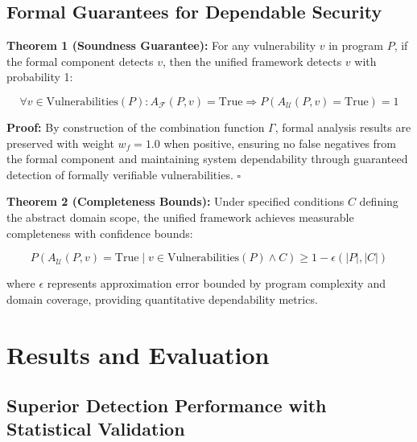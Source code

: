 \documentclass[10pt,journal,compsoc]{IEEEtran}
\begin{document}
\subsection{Formal Guarantees for Dependable Security}

\textbf{Theorem 1 (Soundness Guarantee):} For any vulnerability $v$ in program $P$, if the formal component detects $v$, then the unified framework detects $v$ with probability 1:

\begin{equation}
\forall v \in \text{Vulnerabilities}(P): A_{\mathcal{F}}(P, v) = \text{True} \Rightarrow P(A_{\mathcal{U}}(P, v) = \text{True}) = 1
\end{equation}

\textbf{Proof:} By construction of the combination function $\Gamma$, formal analysis results are preserved with weight $w_f = 1.0$ when positive, ensuring no false negatives from the formal component and maintaining system dependability through guaranteed detection of formally verifiable vulnerabilities. $\square$

\textbf{Theorem 2 (Completeness Bounds):} Under specified conditions $C$ defining the abstract domain scope, the unified framework achieves measurable completeness with confidence bounds:

\begin{equation}
P(A_{\mathcal{U}}(P, v) = \text{True} \mid v \in \text{Vulnerabilities}(P) \wedge C) \geq 1 - \epsilon(|P|, |C|)
\end{equation}

where $\epsilon$ represents approximation error bounded by program complexity and domain coverage, providing quantitative dependability metrics.

\section{Results and Evaluation}

\subsection{Superior Detection Performance with Statistical Validation}
\end{document}
